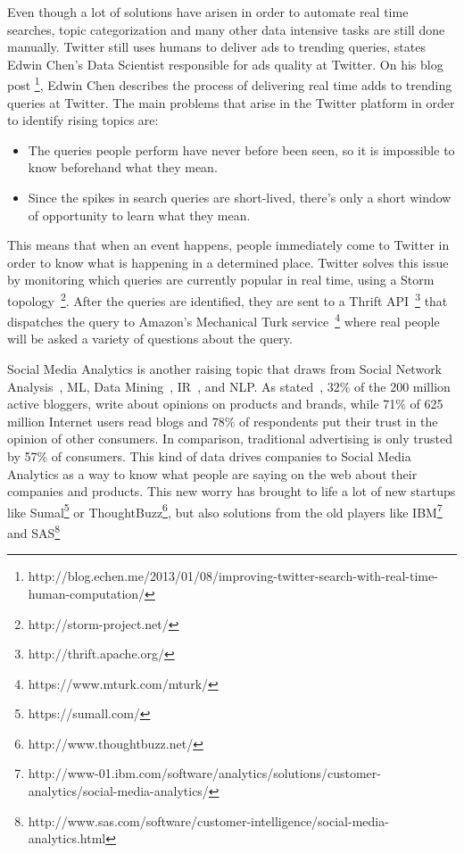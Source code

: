 Even though a lot of solutions have arisen in order to automate real time searches, topic categorization and many other data intensive tasks are still done manually. Twitter still uses humans to deliver ads to trending queries, states Edwin Chen's Data Scientist responsible for ads quality at Twitter. On his blog post \footnote{http://blog.echen.me/2013/01/08/improving-twitter-search-with-real-time-human-computation/}, Edwin Chen describes the process of delivering real time adds to trending queries at Twitter. The main problems that arise in the Twitter platform in order to identify rising topics are:
\begin{itemize}
  \item The queries people perform have never before been seen, so it is impossible to know beforehand what they mean.
  \item Since the spikes in search queries are short-lived, there's only a short window of opportunity to learn what they mean.
\end{itemize}
This means that when an event happens, people immediately come to Twitter in order to know what is happening in a determined place. Twitter solves this issue by monitoring which queries are currently popular in real time, using a Storm topology~\footnote{http://storm-project.net/}. After the queries are identified, they are sent to a Thrift API~\footnote{http://thrift.apache.org/} that dispatches the query to Amazon's Mechanical Turk service~\footnote{https://www.mturk.com/mturk/} where real people will be asked a variety of questions about the query.

Social Media Analytics is another raising topic that draws from Social Network Analysis~\cite{knoke2008social}, \ac{ML}, Data Mining~\cite{witten2005data}, \ac{IR}~\cite{salton1983introduction}, and \ac{NLP}. As stated~\citet{Melville2009}, 32\% of the 200 million active bloggers, write about opinions on products and brands, while 71\% of 625 million Internet users read blogs and 78\% of respondents put their trust in the opinion of other consumers. In comparison, traditional advertising is only trusted by 57\% of consumers.
This kind of data drives companies to Social Media Analytics as a way to know what people are saying on the web about their companies and products. This new worry has brought to life a lot of new startups like Sumal\footnote{https://sumall.com/} or ThoughtBuzz\footnote{http://www.thoughtbuzz.net/}, but also solutions from the old players like IBM\footnote{http://www-01.ibm.com/software/analytics/solutions/customer-analytics/social-media-analytics/} and SAS\footnote{http://www.sas.com/software/customer-intelligence/social-media-analytics.html}

